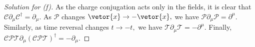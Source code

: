 \begin{proof}[Solution for (f)]
   As the charge conjugation acts only in the fields, it is clear that \(\mathscr{C} \partial_\mu \mathscr{C}^\dag = \partial_\mu.\) As \(\mathscr{P}\) changes \(\vetor{x} \to -\vetor{x},\) we have \(\mathscr{P} \partial_\mu \mathscr{P} = \partial^\mu.\) Similarly, as time reversal changes \(t \to -t,\) we have \(\mathscr{T}\partial_\mu \mathscr{T} = -\partial^\mu.\) Finally, \(\mathscr{CPT} \partial_\mu (\mathscr{CPT})^\dag = - \partial_\mu.\)
\end{proof}
